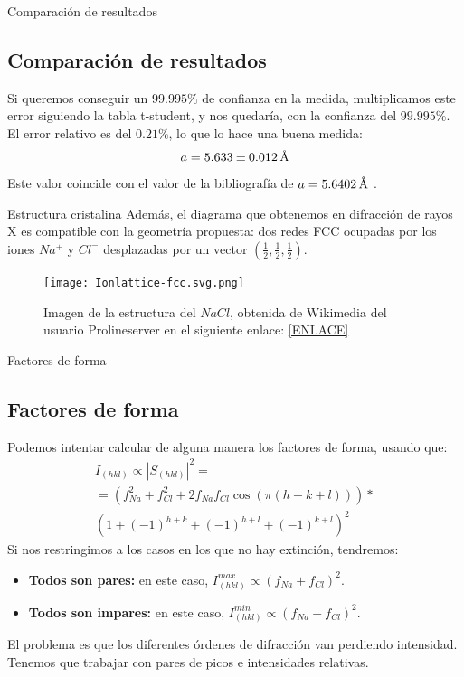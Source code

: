\documentclass{beamer}
\begin{document}
\begin{frame}{Comparación de resultados}
    \subsection{Comparación de resultados}
    Si queremos conseguir un $99.995\%$ de confianza en la medida, multiplicamos este error siguiendo la tabla t-student, y nos quedaría, con la confianza del $99.995\%$. El error relativo es del $0.21\%$, lo que lo hace una buena medida:
    $$
    a = 5.633 \pm 0.012 \, \text{\r{A}}
    $$
    Este valor coincide con el valor de la bibliografía de $a = 5.6402 \, \text{\r{A}}$ \cite{noauthororeditor2007handbook}.
    \begin{block}{Estructura cristalina}
        Además, el diagrama que obtenemos en difracción de rayos X es compatible con la geometría propuesta: dos redes FCC ocupadas por los iones $Na^+$ y $Cl^-$ desplazadas por un vector $\left(\frac{1}{2}, \frac{1}{2}, \frac{1}{2}\right)$.
    \end{block}
    \begin{figure}[h!]
        \begin{center}
            \texttt{[image: Ionlattice-fcc.svg.png]}
        \end{center}
        \caption{Imagen de la estructura del $NaCl$, obtenida de Wikimedia del usuario Prolineserver en el siguiente enlace: \href{https://commons.wikimedia.org/wiki/File:Ionlattice-fcc.svg}{[ENLACE]}}
    \end{figure}
\end{frame}
\begin{frame}{Factores de forma}
    \subsection{Factores de forma}
    Podemos intentar calcular de alguna manera los factores de forma, usando que:
    \begin{align*}
    I_{(hkl)} \propto \left|S_{(hkl)}\right|^2 = \\ = \left(f_{Na}^2 + f_{Cl}^2 +2f_{Na}f_{Cl}\cos\left(\pi(h + k + l)\right)\right)*\\ \left(1 + (-1)^{h+k} + (-1)^{h+l} + (-1)^{k+l}\right)^2
    \end{align*}
    Si nos restringimos a los casos en los que no hay extinción, tendremos:
    \begin{itemize}
        \item \textbf{Todos son pares:} en este caso, $I_{(hkl)}^{max} \propto \left(f_{Na} + f_{Cl}\right)^2$.
        \item \textbf{Todos son impares:} en este caso, $I_{(hkl)}^{min} \propto \left(f_{Na} - f_{Cl}\right)^2$.
    \end{itemize}
    El problema es que los diferentes órdenes de difracción van perdiendo intensidad. Tenemos que trabajar con pares de picos e intensidades relativas.
\end{frame}
\end{document}
